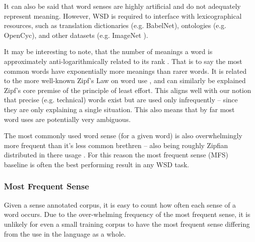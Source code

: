 \documentclass[12pt,parskip]{komatufte}
\begin{document}
It can also be said that word senses are highly artificial and do not adequately represent meaning.
However, WSD is required to interface with  lexicographical resources,
such as translation dictionaries (e.g. BabelNet), ontologies (e.g. OpenCyc), and other datasets (e.g. ImageNet ).


It may be interesting to note, that the number of meanings a word is approximately anti-logarithmically related to its rank .
That is to say the most common words have exponentially more meanings than rarer words.
It is related to the more well-known Zipf's Law on word use , and can similarly be explained Zipf's core premise of the principle of least effort. 
This aligns well with our notion that precise (e.g. technical) words exist but are used only infrequently -- since they are only explaining a single situation.
This also means that by far most word uses are potentially very ambiguous.

The most commonly used word sense (for a given word) is also overwhelmingly more frequent than it's less common brethren -- also being roughly Zipfian distributed in there usage .
For this reason the most frequent sense (MFS) baseline is often the best performing result in any WSD task.
\subsubsection{Most Frequent Sense}\label{sec:most-frequent-sense}
Given a sense annotated corpus, it is easy to count how often each sense of a word occurs.
Due to the over-whelming frequency of the most frequent sense, it is unlikely for even a small training corpus to have the most frequent sense differing from the use in the language as a whole.
\end{document}
